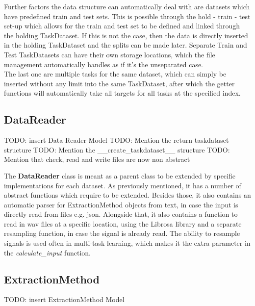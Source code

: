 Further factors the data structure can automatically deal with are datasets which have predefined train and test sets. This is possible through the hold - train - test set-up which allows for the train and test set to be defined and linked through the holding TaskDataset. If this is not the case, then the data is directly inserted in the holding TaskDataset and the splits can be made later. Separate Train and Test TaskDatasets can have their own storage locations, which the file management automatically handles as if it's the unseparated case.\\

The last one are multiple tasks for the same dataset, which can simply be inserted without any limit into the same TaskDataset, after which the getter functions will automatically take all targets for all tasks at the specified index. \\

\subsection{DataReader} \label{Impl:DataRead:DataReader}

TODO: insert Data Reader Model
TODO: Mention the return taskdataset structure
TODO: Mention the \_\_create\_taskdataset\_\_ structure
TODO: Mention that check, read and write files are now non abstract

The \textbf{DataReader} class is meant as a parent class to be extended by specific implementations for each dataset. As previously mentioned, it has a number of abstract functions which require to be extended. Besides those, it also contains an automatic parser for ExtractionMethod objects from text, in case the input is directly read from files e.g. json. Alongside that, it also contains a function to read in wav files at a specific location, using the Librosa library and a separate resampling function, in case the signal is already read. The ability to resample signals is used often in multi-task learning, which makes it the extra parameter in the \textit{calculate\_input} function.

\subsection{ExtractionMethod} \label{Impl:DataRead:ExtractionMethod}

TODO: insert ExtractionMethod Model

